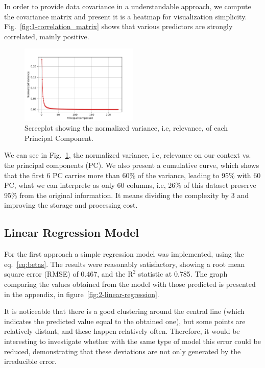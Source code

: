 In order to provide data covariance in a understandable approach, we compute the covariance matrix and present it is a heatmap for visualization simplicity. Fig.~\ref{fig:1-correlation_matrix} shows that various predictors are strongly correlated, mainly positive.

\begin{figure}[htbp!]
  \centerline{\includegraphics[width=0.50\textwidth]{../../code/hw2/figures/0-PCA-screeplot.pdf}}
  \caption{Screeplot showing the normalized variance, i.e, relevance, of each Principal Component.}
  \label{fig:0-PCA-screeplot}
\end{figure}

We can see in Fig.~\ref{fig:0-PCA-screeplot}, the normalized variance, i.e, relevance on our context vs. the principal components (PC). We also present a cumulative curve, which shows that the first 6 PC carries more than 60\% of the variance, leading to 95\% with 60 PC, what we can interprete as only 60 columns, i.e, 26\% of this dataset preserve 95\% from the original information. It means dividing the complexity by 3 and improving the storage and processing cost.

\subsection{Linear Regression Model}
For the first approach a simple regression model was implemented, using the eq.~\ref{eq:betas}. The results were reasonably satisfactory, showing a root mean square error (RMSE) of 0.467, and the $\text{R}^2$ statistic at 0.785. The graph comparing the values obtained from the model with those predicted is presented in the appendix, in figure~\ref{fig:2-linear-regression}. 

It is noticeable that there is a good clustering around the central line (which indicates the predicted value equal to the obtained one), but some points are relatively distant, and these happen relatively often. Therefore, it would be interesting to investigate whether with the same type of model this error could be reduced, demonstrating that these deviations are not only generated by the irreducible error.

